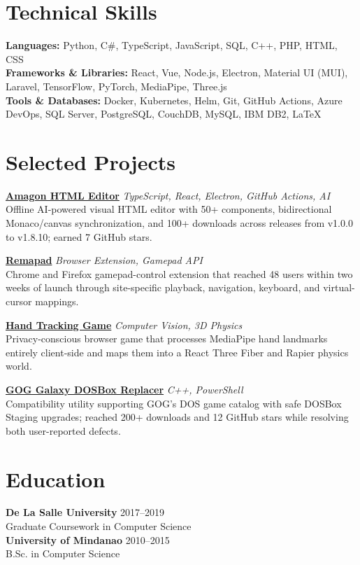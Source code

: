 \documentclass[11pt,letterpaper]{article}
\begin{document}
\section{Technical Skills}
\noindent
\textbf{Languages:} Python, C\#, TypeScript, JavaScript, SQL, C++, PHP, HTML, CSS \\
\textbf{Frameworks \& Libraries:} React, Vue, Node.js, Electron, Material UI (MUI), Laravel, TensorFlow, PyTorch, MediaPipe, Three.js \\
\textbf{Tools \& Databases:} Docker, Kubernetes, Helm, Git, GitHub Actions, Azure DevOps, SQL Server, PostgreSQL, CouchDB, MySQL, IBM DB2, \LaTeX

\section{Selected Projects}
\noindent
\href{https://github.com/Shin-Aska/amagon-html-editor}{\textbf{Amagon HTML Editor}} \hfill \textit{TypeScript, React, Electron, GitHub Actions, AI} \\
Offline AI-powered visual HTML editor with 50+ components, bidirectional Monaco/canvas synchronization, and 100+ downloads across releases from v1.0.0 to v1.8.10; earned 7 GitHub stars.

\vspace{4pt}
\noindent
\href{https://gitlab.com/ShinAska/remapad}{\textbf{Remapad}} \hfill \textit{Browser Extension, Gamepad API} \\
Chrome and Firefox gamepad-control extension that reached 48 users within two weeks of launch through site-specific playback, navigation, keyboard, and virtual-cursor mappings.

\vspace{4pt}
\noindent
\href{https://github.com/Shin-Aska/poc-camera-ml}{\textbf{Hand Tracking Game}} \hfill \textit{Computer Vision, 3D Physics} \\
Privacy-conscious browser game that processes MediaPipe hand landmarks entirely client-side and maps them into a React Three Fiber and Rapier physics world.

\vspace{4pt}
\noindent
\href{https://github.com/Shin-Aska/DosboxStagingReplacerForGOGGalaxy}{\textbf{GOG Galaxy DOSBox Replacer}} \hfill \textit{C++, PowerShell} \\
Compatibility utility supporting GOG's DOS game catalog with safe DOSBox Staging upgrades; reached 200+ downloads and 12 GitHub stars while resolving both user-reported defects.

\section{Education}
\noindent
\textbf{De La Salle University} \hfill 2017--2019 \\
Graduate Coursework in Computer Science \\
\vspace{4pt}
\noindent
\textbf{University of Mindanao} \hfill 2010--2015 \\
B.Sc. in Computer Science
\end{document}
